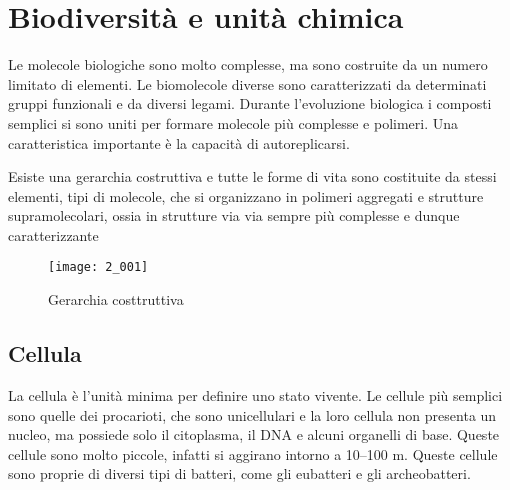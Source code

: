 \chapter{Biodiversità e unità chimica}

Le molecole biologiche sono molto complesse, ma sono costruite da un
numero limitato di elementi. Le biomolecole diverse sono caratterizzati
da determinati gruppi funzionali e da diversi legami. Durante
l'evoluzione biologica i composti semplici si sono uniti per formare
molecole più complesse e polimeri. Una caratteristica importante è la
capacità di autoreplicarsi.


Esiste una gerarchia costruttiva e tutte le forme di vita sono
costituite da stessi elementi, tipi di molecole, che si organizzano in
polimeri aggregati e strutture supramolecolari, ossia in strutture via
via sempre più complesse e dunque caratterizzante

\begin{figure}[H]
    \centering
    \texttt{[image: 2\_001]}
    \caption{Gerarchia costtruttiva}
\end{figure}

\clearpage

\section{Cellula}


La cellula è l'unità minima per definire uno stato vivente. Le cellule
più semplici sono quelle dei procarioti, che sono unicellulari e la loro
cellula non presenta un nucleo, ma possiede solo il citoplasma, il DNA e
alcuni organelli di base. Queste cellule sono molto piccole, infatti si
aggirano intorno a 10--100 \mu m. Queste cellule sono proprie di diversi
tipi di batteri, come gli eubatteri e gli archeobatteri.

